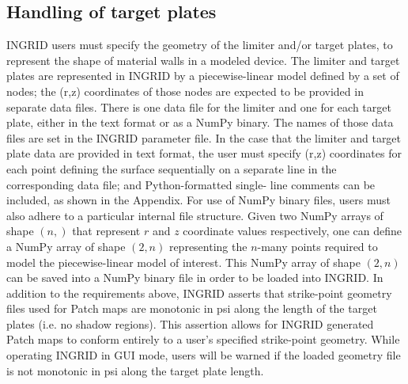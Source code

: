 \subsection{Handling of target plates}
INGRID users must specify the geometry of the limiter and/or target plates, to represent the shape of material walls in a modeled device. The limiter and target plates are represented in INGRID by a piecewise-linear model defined by a set of nodes; the (r,z) coordinates of those nodes are expected to be provided in separate data files. There is one data file for the limiter and one for each target plate, either in the text format or as a NumPy binary. The names of those data files are set in the INGRID parameter file. In the case that the limiter and target plate data are provided in text format, the user must specify (r,z) coordinates for each point defining the surface sequentially on a separate line in the corresponding data file; and Python-formatted single- line comments can be included, as shown in the Appendix.
For use of NumPy binary files, users must also adhere to a particular internal file structure. Given two NumPy arrays of shape $(n, )$ that represent $r$ and $z$ coordinate values respectively, one can define a NumPy array of shape $(2,n)$ representing the $n$-many points required to model the piecewise-linear model of interest. This NumPy array of shape $(2, n)$ can be saved into a NumPy binary file in order to be loaded into INGRID.
In addition to the requirements above, INGRID asserts that strike-point geometry files used for Patch maps are monotonic in psi along the length of the target plates (i.e. no shadow regions). This assertion allows for INGRID generated Patch maps to conform entirely to a user's specified strike-point geometry. While operating INGRID in GUI mode, users will be warned if the loaded geometry file is not monotonic in psi along the target plate length. 